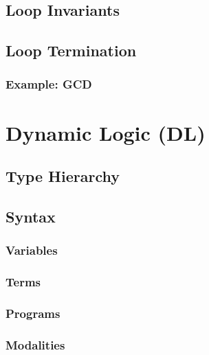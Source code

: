 \documentclass[a4paper, 11pt, accentcolor = tud3b]{tudreport}
\begin{document}
		\section{Loop Invariants} %

		\section{Loop Termination} %

			\subsection{Example: GCD} %

	\chapter{Dynamic Logic (DL)} %

		\section{Type Hierarchy} %

		\section{Syntax} %

			\subsection{Variables} %

			\subsection{Terms} %

			\subsection{Programs} %

			\subsection{Modalities} %
\end{document}
